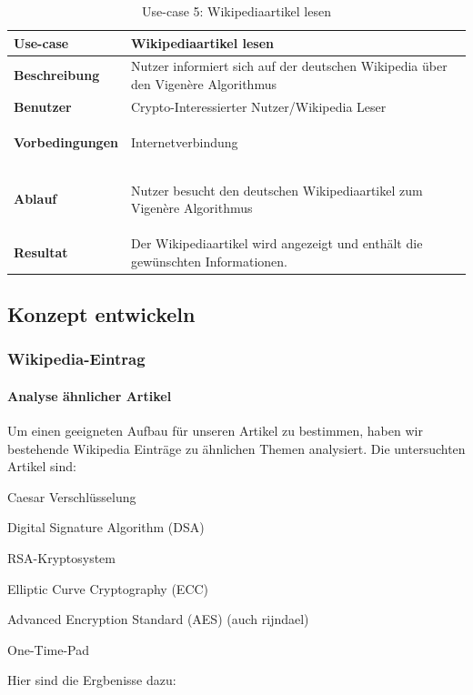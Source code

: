 \documentclass[11pt,paper=a4,final]{scrartcl}
\begin{document}
\begin{table}[h!]
  \centering
  \begin{tabular}{|l|p{12cm}|}\hline
    \bf Use-case & \bf Wikipediaartikel lesen \\ \hline
    \bf Beschreibung & Nutzer informiert sich auf der deutschen Wikipedia \"uber
    den Vigen\`ere Algorithmus \\ \hline
    \bf Benutzer & Crypto-Interessierter Nutzer/Wikipedia Leser \\ \hline
    \bf Vorbedingungen & \begin{itemize*} \item Internetverbindung
    \end{itemize*} \\ \hline
    \bf Ablauf & \begin{itemize*}\item Nutzer besucht den deutschen
    Wikipediaartikel zum Vigen\`ere Algorithmus \end{itemize*} \\ \hline
    \bf Resultat & Der Wikipediaartikel wird angezeigt und enth\"alt die
    gew\"unschten Informationen. \\ \hline
  \end{tabular}
  \caption{Use-case 5: Wikipediaartikel lesen}
  \label{tab:usecase5}
\end{table}
\subsection{Konzept entwickeln}
\subsubsection{Wikipedia-Eintrag}
\paragraph{Analyse \"ahnlicher Artikel}
Um einen geeigneten Aufbau f\"ur unseren Artikel zu bestimmen, haben wir
bestehende Wikipedia Eintr\"age zu \"ahnlichen Themen analysiert. Die
untersuchten Artikel sind:
\begin{itemize*}
  \item Caesar Verschl\"usselung
  \item Digital Signature Algorithm (DSA)
  \item RSA-Kryptosystem 
  \item Elliptic Curve Cryptography (ECC)
  \item Advanced Encryption Standard (AES) (auch rijndael)
  \item One-Time-Pad
\end{itemize*}
Hier sind die Ergbenisse dazu:
\end{document}
